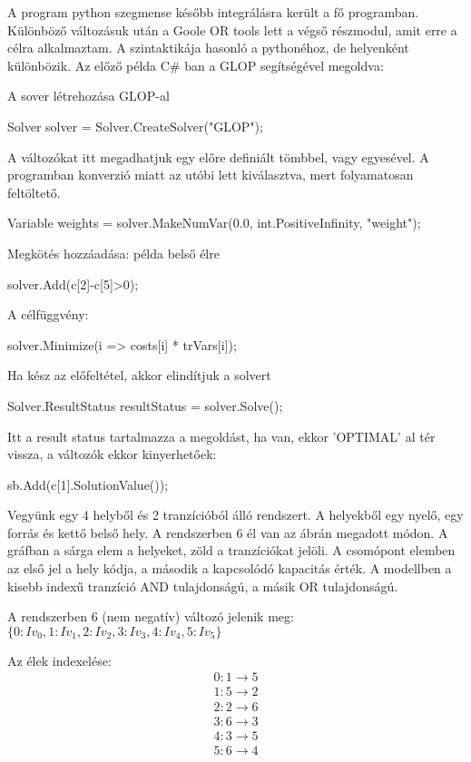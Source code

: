 A program python szegmense később integrálásra került a fő programban. Különböző változásuk után a Goole OR tools lett a végső részmodul, amit erre a célra alkalmaztam. A szintaktikája hasonló a pythonéhoz, de helyenként különbözik. Az előző példa C\# ban a GLOP segítségével megoldva:

A sover létrehozása GLOP-al
\begin{cpp}
Solver solver = Solver.CreateSolver("GLOP");
\end{cpp}
A változókat itt megadhatjuk egy előre definiált tömbbel, vagy egyesével. A programban konverzió miatt az utóbi lett kiválasztva, mert folyamatosan feltöltető.
\begin{cpp}
Variable weights = solver.MakeNumVar(0.0, int.PositiveInfinity, "weight");
\end{cpp}
Megkötés hozzáadása: példa belső élre
\begin{cpp}
solver.Add(c[2]-c[5]>0);
\end{cpp}
A célfüggvény:
\begin{cpp}
solver.Minimize(i => costs[i] * trVars[i]);
\end{cpp}
Ha kész az előfeltétel, akkor elindítjuk a solvert
\begin{cpp}
Solver.ResultStatus resultStatus = solver.Solve();
\end{cpp}
Itt a result status tartalmazza a megoldást, ha van, ekkor 'OPTIMAL' al tér vissza, a változók ekkor kinyerhetőek:
\begin{cpp}
sb.Add(c[1].SolutionValue());
\end{cpp}

Vegyünk egy 4 helyből és 2 tranzícióból álló rendszert. A helyekből egy nyelő, egy forrás és kettő belső hely. A rendszerben 6 él van az ábrán megadott módon.  A gráfban a sárga elem a helyeket, zöld a tranzíciókat jelöli. A csomópont elemben az első jel a hely kódja, a második a kapcsolódó kapacitás érték. A modellben a kisebb indexű tranzíció AND tulajdonságú, a másik OR tulajdonságú. 

A rendszerben 6 (nem negatív) változó jelenik meg:  $\{0: Iv_0, 1: Iv_1, 2: Iv_2, 3: Iv_3, 4: Iv_4, 5: Iv_5\}$

Az élek indexelése:
\begin{align*}
0  :  1 \rightarrow 5  \\
1  :  5 \rightarrow 2  \\
2  :  2 \rightarrow 6  \\
3  :  6 \rightarrow 3  \\
4  :  3 \rightarrow 5  \\
5  :  6 \rightarrow 4 
\end{align*}

